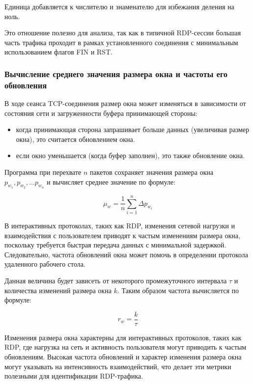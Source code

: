 \documentclass[spec, och, diploma]{SCWorks}
\begin{document}
Единица добавляется к числителю и знаменателю для избежания деления на ноль.

Это отношение полезно для анализа, так как в типичной RDP-сессии большая часть трафика проходит в рамках установленного соединения с 
минимальным использованием флагов FIN и RST.

\subsubsection{Вычисление среднего значения размера окна и частоты его обновления}

В ходе сеанса TCP-соединения размер окна может изменяться в зависимости от состояния сети и загруженности буфера принимающей стороны:

\begin{itemize}
  \item когда принимающая сторона запрашивает больше данных (увеличивая размер окна), это считается обновлением окна.
  \item если окно уменьшается (когда буфер заполнен), это также обновление окна.
\end{itemize}

 Программа при перехвате $n$ пакетов сохраняет значения размера окна $p_{w_1}, p_{w_2}, \dots p_{w_n}$ и вычисляет среднее значение по формуле:

 \begin{equation}
  \mu_w = \frac{1}{n} \sum_{i=1}^{n} \Delta p_{w_i}
\end{equation}

В интерактивных протоколах, таких как RDP, изменения сетевой нагрузки и взаимодействия с пользователем приводят к частым изменениям размера окна, 
поскольку требуется быстрая передача данных с минимальной задержкой. Следовательно, частота обновлений окна может помочь в определении 
протокола удаленного рабочего стола.

Данная величина будет зависеть от некоторого промежуточного интервала $\tau$ и количества изменений размера окна $k$. Таким образом частота вычисляется по формуле:

\begin{equation}
  r_w = \frac{k}{\tau}
\end{equation}

Изменения размера окна характерны для интерактивных протоколов, таких как RDP, где нагрузка на сеть и активность пользователя могут приводить к частым 
обновлениям. Высокая частота обновлений и характер изменения размера окна могут указывать на интенсивность взаимодействий, что делает эти метрики 
полезными для идентификации RDP-трафика.
\end{document}
